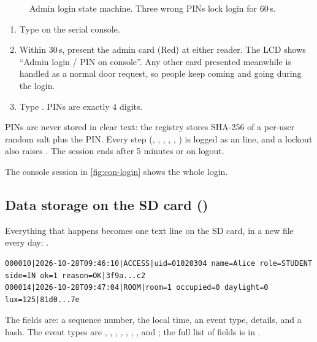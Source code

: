 \begin{figure}[H]
\centering
{}
\caption{Admin login state machine. Three wrong PINs lock login for 60\,s.}
\label{fig:auth}
\end{figure}

\begin{enumerate}
  \item Type  on the serial console.
  \item Within 30\,s, present the admin card (Red) at either reader. The LCD shows
        \enquote{Admin login / PIN on console}. Any other card presented meanwhile is handled as a
        normal door request, so people keep coming and going during the login.
  \item Type . PINs are exactly 4 digits.
\end{enumerate}
PINs are never stored in clear text: the registry stores SHA-256 of a per-user random salt plus
the PIN. Every step (, , , , ,
) is logged as an  line, and a lockout also raises
. The session ends after 5 minutes or on logout.

The console session in \cref{fig:con-login} shows the whole login.

\subsection{Data storage on the SD card ()}
\label{sec:op-storage}
Everything that happens becomes one text line on the SD card, in a new file every day:
.
\begin{lstlisting}[style=console]
000010|2026-10-28T09:46:10|ACCESS|uid=01020304 name=Alice role=STUDENT side=IN ok=1 reason=OK|3f9a...c2
000014|2026-10-28T09:47:04|ROOM|room=1 occupied=0 daylight=0 lux=125|81d0...7e
\end{lstlisting}
The fields are: a sequence number, the local time, an event type,  details, and a
hash. The event types are , , , , ,
, ,  and ; the full list of fields is in
.

